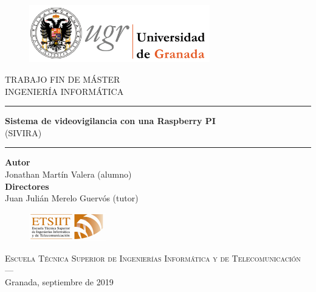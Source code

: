 	\begin{figure}[h]
		\centering
		\includegraphics[width=0.7\textwidth]{images/logoUGR.jpg}
		\label{imagen2}
	\end{figure}

	\begin{center}
		\Large{TRABAJO FIN DE MÁSTER} \\
		\large{INGENIERÍA INFORMÁTICA}
	\end{center}
	
	\vspace{0.5cm}
	
	\hrule
	
	\begin{center}
		\huge{\textbf{Sistema de videovigilancia con una Raspberry PI}} \\
		\Large{(SIVIRA)}
	\end{center}
	
	\hrule
	
	\vspace{0.5cm}
	
	\begin{center}
		\textbf{Autor} \\
		Jonathan Martín Valera (alumno)\\
		\textbf{Directores}\\
		Juan Julián Merelo Guervós (tutor)
	\end{center}
	
	\vspace{0.6cm}
	
	\begin{figure}[h]
		\centering
		\includegraphics[width=0.3\textwidth]{images/etsiit_logo.png}\\[0.1cm]
	\end{figure}
	
	\begin{center}
	\textsc{Escuela Técnica Superior de Ingenierías Informática y de Telecomunicación}\\
	\textsc{---}\\
	Granada, septiembre de 2019
	\end{center}
	
	\newpage